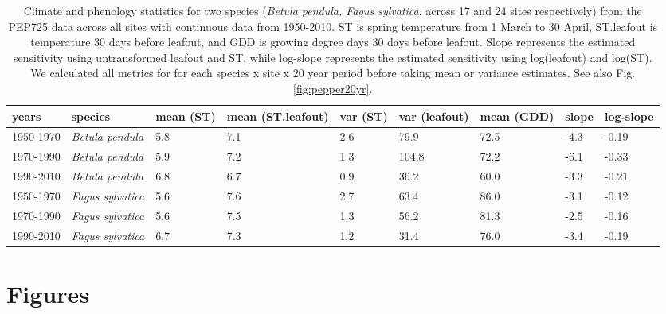 \documentclass[11pt]{article}
\begin{document}
\begin{table}[ht]
\centering
\caption{Climate and phenology statistics for two species (\emph{Betula pendula, Fagus sylvatica}, across 17 and 24 sites respectively) from the PEP725 data across all sites with continuous data from 1950-2010. ST is spring temperature from 1 March to 30 April, ST.leafout is temperature 30 days before leafout, and GDD is growing degree days 30 days before leafout. Slope represents the estimated sensitivity using untransformed leafout and ST, while log-slope represents the estimated sensitivity using log(leafout) and log(ST). We calculated all metrics for for each species  x site x 20 year period before taking mean or variance estimates. See also Fig. \ref{fig:pepper20yr}.} 
\label{tab:pep20yr}
\begingroup\footnotesize
\begin{tabular}{|p{}|p{}|p{}|p{}|p{}|p{}|p{}|p{}|p{}|}
  \hline
years & species & mean (ST) & mean (ST.leafout) & var (ST) & var (leafout) & mean (GDD) & slope & log-slope \\ 
  \hline
1950-1970 & \emph{Betula pendula} & 5.8 & 7.1 & 2.6 & 79.9 & 72.5 & -4.3 & -0.19 \\ 
  1970-1990 & \emph{Betula pendula} & 5.9 & 7.2 & 1.3 & 104.8 & 72.2 & -6.1 & -0.33 \\ 
  1990-2010 & \emph{Betula pendula} & 6.8 & 6.7 & 0.9 & 36.2 & 60.0 & -3.3 & -0.21 \\ 
  1950-1970 & \emph{Fagus sylvatica} & 5.6 & 7.6 & 2.7 & 63.4 & 86.0 & -3.1 & -0.12 \\ 
  1970-1990 & \emph{Fagus sylvatica} & 5.6 & 7.5 & 1.3 & 56.2 & 81.3 & -2.5 & -0.16 \\ 
  1990-2010 & \emph{Fagus sylvatica} & 6.7 & 7.3 & 1.2 & 31.4 & 76.0 & -3.4 & -0.19 \\ 
   \hline
\end{tabular}
\endgroup
\end{table}

\clearpage
\section{Figures}
\end{document}
